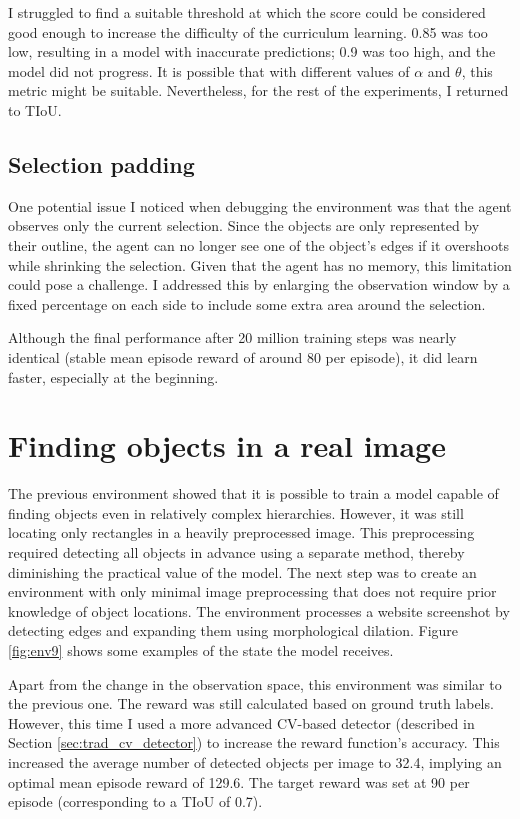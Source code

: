 \documentclass[
  digital,     %
  oneside,     %
  nosansbold,  %
  nocolorbold, %
  lof,         %
  lot,         %
]{fithesis4}
\begin{document}
I struggled to find a suitable threshold at which the score could be considered good enough to increase the difficulty of the curriculum learning. 0.85 was too low, resulting in a model with inaccurate predictions; 0.9 was too high, and the model did not progress. It is possible that with different values of $\alpha$ and $\theta$, this metric might be suitable. Nevertheless, for the rest of the experiments, I returned to TIoU.

\subsection{Selection padding}

One potential issue I noticed when debugging the environment was that the agent observes only the current selection. Since the objects are only represented by their outline, the agent can no longer see one of the object's edges if it overshoots while shrinking the selection. Given that the agent has no memory, this limitation could pose a challenge. I addressed this by enlarging the observation window by a fixed percentage on each side to include some extra area around the selection.

Although the final performance after 20 million training steps was nearly identical (stable mean episode reward of around 80 per episode), it did learn faster, especially at the beginning.

\section{Finding objects in a real image}

The previous environment showed that it is possible to train a model capable of finding objects even in relatively complex hierarchies. However, it was still locating only rectangles in a heavily preprocessed image. This preprocessing required detecting all objects in advance using a separate method, thereby diminishing the practical value of the model. The next step was to create an environment with only minimal image preprocessing that does not require prior knowledge of object locations. The environment processes a website screenshot by detecting edges and expanding them using morphological dilation. Figure \ref{fig:env9} shows some examples of the state the model receives.

Apart from the change in the observation space, this environment was similar to the previous one. The reward was still calculated based on ground truth labels. However, this time I used a more advanced CV-based detector (described in Section \ref{sec:trad_cv_detector}) to increase the reward function's accuracy. This increased the average number of detected objects per image to 32.4, implying an optimal mean episode reward of 129.6. The target reward was set at 90 per episode (corresponding to a TIoU of 0.7).
\end{document}
